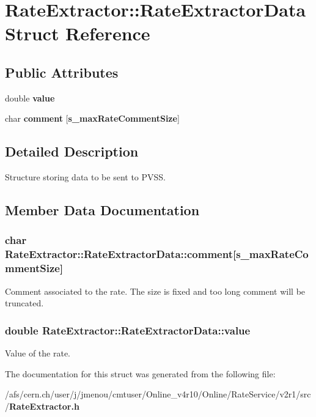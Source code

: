 \section{Rate\-Extractor::Rate\-Extractor\-Data Struct Reference}
\label{structRateExtractor_1_1RateExtractorData}
\subsection*{Public Attributes}
\begin{CompactItemize}
\item 
double {\bf value}
\item 
char {\bf comment} [{\bf s\_\-max\-Rate\-Comment\-Size}]
\end{CompactItemize}


\subsection{Detailed Description}
Structure storing data to be sent to PVSS. 



\subsection{Member Data Documentation}
\subsubsection{\setlength{\rightskip}{0pt plus 5cm}char {\bf Rate\-Extractor::Rate\-Extractor\-Data::comment}[{\bf s\_\-max\-Rate\-Comment\-Size}]}\label{structRateExtractor_1_1RateExtractorData_o1}


Comment associated to the rate. The size is fixed and too long comment will be truncated. 
\subsubsection{\setlength{\rightskip}{0pt plus 5cm}double {\bf Rate\-Extractor::Rate\-Extractor\-Data::value}}\label{structRateExtractor_1_1RateExtractorData_o0}


Value of the rate. 

The documentation for this struct was generated from the following file:\begin{CompactItemize}
\item 
/afs/cern.ch/user/j/jmenou/cmtuser/Online\_\-v4r10/Online/Rate\-Service/v2r1/src/{\bf Rate\-Extractor.h}\end{CompactItemize}
